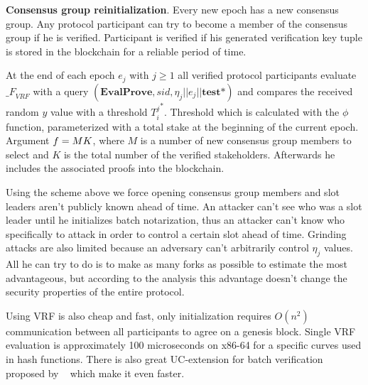 \begin{legal}
    \item \textbf{Consensus group reinitialization}.
    Every new epoch has a new consensus group.
    Any protocol participant can try to become a member of the consensus group if he is verified.
    Participant is verified if his generated verification key tuple is stored in the blockchain for a reliable period of time.
    \begin{legal}
        \item At the end of each epoch $e_j$ with $j \geqslant 1$ all verified protocol participants
        evaluate ${\mathcal_{F}}_{VRF}$ with a query ${(\textbf{EvalProve}, sid, \eta_j || e_j || \textbf{test*})}$ and compares the received random $y$ value with a threshold ${T_i^j}^*$.
        Threshold which is calculated with the $\phi$ function, parameterized with a total stake at the beginning of the current epoch.
        Argument ${f = M \/ K}$, where $M$ is a number of new consensus group members to select and $K$ is the total number of the verified stakeholders.
        Afterwards he includes the associated proofs into the blockchain.
    \end{legal}
\end{legal}


Using the scheme above we force opening consensus group members and slot leaders aren't publicly known ahead of time.
An attacker can't see who was a slot leader until he initializes batch notarization, thus an attacker can't know
who specifically to attack in order to control a certain slot ahead of time.
Grinding attacks are also limited because an adversary can't arbitrarily control $\eta_j$ values.
All he can try to do is to make as many forks as possible to estimate the most advantageous, but according to the analysis this advantage doesn't change the security properties of the entire protocol.

Using VRF is also cheap and fast, only initialization requires ${O(n^2)}$ communication between all participants to agree on a genesis block.
Single VRF evaluation is approximately 100 microseconds on x86-64 for a specific curves used in hash functions.
There is also great UC-extension for batch verification proposed by ~\cite{cryptoeprint:2022/1045} which make it even faster.